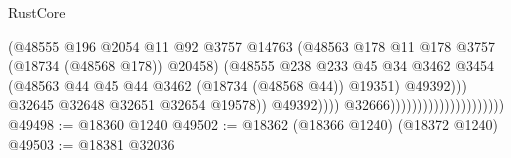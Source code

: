\begin{lexlean}{RustCore}
\begin{coremodule}
                                                            (@48555
                                                              @196
                                                              @2054
                                                              @11
                                                              @92
                                                              @3757
                                                              @14763
                                                              (@48563
                                                                @178
                                                                @11
                                                                @178
                                                                @3757
                                                                (@18734 (@48568 @178))
                                                                @20458)
                                                              (@48555
                                                                @238
                                                                @233
                                                                @45
                                                                @34
                                                                @3462
                                                                @3454
                                                                (@48563
                                                                  @44
                                                                  @45
                                                                  @44
                                                                  @3462
                                                                  (@18734 (@48568 @44))
                                                                  @19351)
                                                                @49392)))
                                                          @32645
                                                          @32648
                                                          @32651
                                                          @32654
                                                          @19578))
                                                      @49392))))
                                              @32666)))))))))))))))))))))
@49498 := @18360 @1240
@49502 := @18362 (@18366 @1240) (@18372 @1240)
@49503 := @18381 @32036

\end{coremodule}
\end{lexlean}
